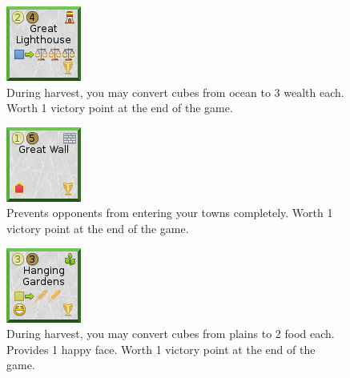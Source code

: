 \documentclass[11pt,a4paper,titlepage]{article}
\begin{document}
{  \begin{figure}[!htb]
    \begin{minipage}[c]{0.1\textwidth}
      \includegraphics[scale=.7]{doe_wonder_great_lighthouse.png}
    \end{minipage}\hfill
    \begin{minipage}[c]{0.6\textwidth}
      \captionsetup{labelformat=empty, justification=justified, singlelinecheck=false}
      \caption{During harvest, you may convert cubes from ocean to 3 wealth each. Worth 1 victory point at the end of the game.}
    \end{minipage}\hfill
    \label{fig:wonder_great_lighthouse}
  \end{figure}

  \begin{figure}[!htb]
    \begin{minipage}[c]{0.1\textwidth}
      \includegraphics[scale=.7]{doe_wonder_great_wall.png}
    \end{minipage}\hfill
    \begin{minipage}[c]{0.6\textwidth}
      \captionsetup{labelformat=empty, justification=justified, singlelinecheck=false}
      \caption{Prevents opponents from entering your towns completely. Worth 1 victory point at the end of the game.}
    \end{minipage}\hfill
    \label{fig:wonder_great_wall}
  \end{figure}

  \begin{figure}[!htb]
    \begin{minipage}[c]{0.1\textwidth}
      \includegraphics[scale=.7]{doe_wonder_hanging_gardens.png}
    \end{minipage}\hfill
    \begin{minipage}[c]{0.6\textwidth}
      \captionsetup{labelformat=empty, justification=justified, singlelinecheck=false}
      \caption{During harvest, you may convert cubes from plains to 2 food each. Provides 1 happy face. Worth 1 victory point at the end of the game.}
    \end{minipage}\hfill
    \label{fig:wonder_hanging_gardens}
  \end{figure}

}
\end{document}
